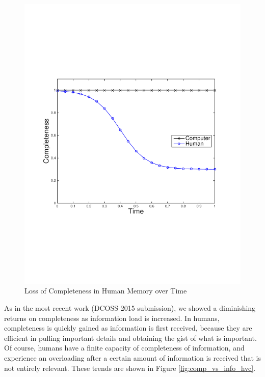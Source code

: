 \begin{figure}
\begin{centering}
    \includegraphics[clip=true, trim = 15mm 65mm 25mm 70mm, scale=0.40]{figures/example_qoi_trends/completeness_vs_time_hvc.pdf}
    \caption{ Loss of Completeness in Human Memory over Time }
    \label{fig:comp_vs_time_hvc}
\end{centering}
\end{figure}

As in the most recent work (DCOSS 2015 submission), we showed a diminishing returns on completeness as information load is increased.  In humans, completeness is quickly gained as information is first received, because they are efficient in pulling important details and obtaining the gist of what is important.  Of course, humans have a finite capacity of completeness of information, and experience an overloading after a certain amount of information is received that is not entirely relevant.  These trends are shown in Figure \ref{fig:comp_vs_info_hvc}.

